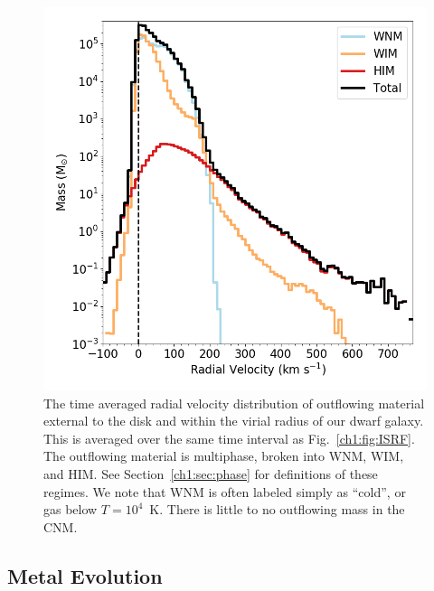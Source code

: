 \begin{figure}
\centering
\includegraphics[width=0.75\linewidth]{figures/ch1/velocity_distribution_time_average}
\caption{The time averaged radial velocity distribution of outflowing material external to the disk and within the virial radius of our dwarf galaxy. This is averaged over the same time interval as Fig.~\ref{ch1:fig:ISRF}. The outflowing material is multiphase, broken into WNM, WIM, and HIM. See Section~\ref{ch1:sec:phase} for definitions of these regimes. We note that WNM is often labeled simply as ``cold'', or gas below $T = 10^{4}$~K. There is little to no outflowing mass in the CNM.}
\label{ch1:fig:outflow_velocity}
\end{figure}

\subsection{Metal Evolution}
\label{ch1:sec:chemical evolution}

